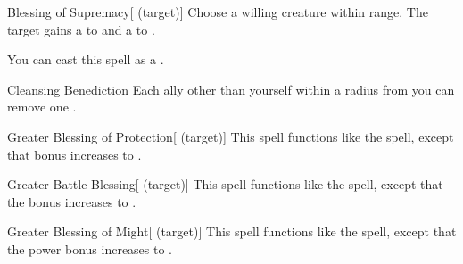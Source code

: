 \lowercase{\hypertarget{spell:Blessing of Supremacy}{}}\label{spell:Blessing of Supremacy}
\begin{attuneability}[\nth{3}]{\hypertarget{spell:Blessing of Supremacy}{Blessing of Supremacy}}[ (target)]
Choose a willing creature within \rngclose range.
The target gains a   to  and a   to .

You can cast this spell as a .
\end{attuneability}
\vspace{0.25em}



\lowercase{\hypertarget{spell:Cleansing Benediction}{}}\label{spell:Cleansing Benediction}
\begin{freeability}[\nth{4}]{\hypertarget{spell:Cleansing Benediction}{Cleansing Benediction}}
Each ally other than yourself within a \areamed radius from you can remove one .
\end{freeability}
\vspace{0.25em}



\lowercase{\hypertarget{spell:Greater Blessing of Protection}{}}\label{spell:Greater Blessing of Protection}
\begin{attuneability}[\nth{4}]{\hypertarget{spell:Greater Blessing of Protection}{Greater Blessing of Protection}}[ (target)]
This spell functions like the  spell, except that bonus increases to .
\end{attuneability}
\vspace{0.25em}



\lowercase{\hypertarget{spell:Greater Battle Blessing}{}}\label{spell:Greater Battle Blessing}
\begin{attuneability}[\nth{5}]{\hypertarget{spell:Greater Battle Blessing}{Greater Battle Blessing}}[ (target)]
This spell functions like the  spell, except that the bonus increases to .
\end{attuneability}
\vspace{0.25em}



\lowercase{\hypertarget{spell:Greater Blessing of Might}{}}\label{spell:Greater Blessing of Might}
\begin{attuneability}[\nth{5}]{\hypertarget{spell:Greater Blessing of Might}{Greater Blessing of Might}}[ (target)]
This spell functions like the  spell, except that the power bonus increases to .
\end{attuneability}
\vspace{0.25em}



